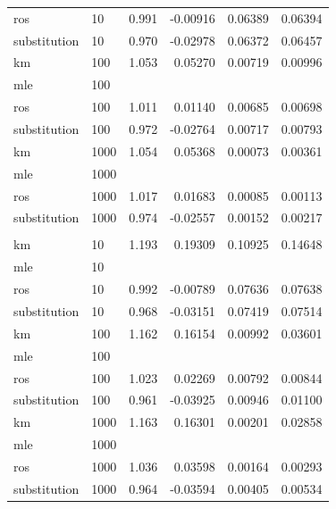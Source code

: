 \documentclass[12pt, twoside]{amherstthesis}
\begin{document}
\begin{table}
\begin{tabular}[t]{llrrrr}
\hspace{1em}ros & 10 & 0.991 & -0.00916 & 0.06389 & 0.06394\\
\hspace{1em}substitution & 10 & 0.970 & -0.02978 & 0.06372 & 0.06457\\
\hline
\hspace{1em}km & 100 & 1.053 & 0.05270 & 0.00719 & 0.00996\\
\hspace{1em}mle & 100 &  &  &  \vphantom{1} & \\
\hspace{1em}ros & 100 & 1.011 & 0.01140 & 0.00685 & 0.00698\\
\hspace{1em}substitution & 100 & 0.972 & -0.02764 & 0.00717 & 0.00793\\
\hline
\hspace{1em}km & 1000 & 1.054 & 0.05368 & 0.00073 & 0.00361\\
\hspace{1em}mle & 1000 &  &  &  \vphantom{1} & \\
\hspace{1em}ros & 1000 & 1.017 & 0.01683 & 0.00085 & 0.00113\\
\hspace{1em}substitution & 1000 & 0.974 & -0.02557 & 0.00152 & 0.00217\\
\hline
\addlinespace[1em]
\multicolumn{6}{l}{\textbf{Censoring Rate = 0.5}}\\
\hspace{1em}km & 10 & 1.193 & 0.19309 & 0.10925 & 0.14648\\
\hspace{1em}mle & 10 &  &  &  & \\
\hspace{1em}ros & 10 & 0.992 & -0.00789 & 0.07636 & 0.07638\\
\hspace{1em}substitution & 10 & 0.968 & -0.03151 & 0.07419 & 0.07514\\
\hline
\hspace{1em}km & 100 & 1.162 & 0.16154 & 0.00992 & 0.03601\\
\hspace{1em}mle & 100 &  &  &  & \\
\hspace{1em}ros & 100 & 1.023 & 0.02269 & 0.00792 & 0.00844\\
\hspace{1em}substitution & 100 & 0.961 & -0.03925 & 0.00946 & 0.01100\\
\hline
\hspace{1em}km & 1000 & 1.163 & 0.16301 & 0.00201 & 0.02858\\
\hspace{1em}mle & 1000 &  &  &  & \\
\hspace{1em}ros & 1000 & 1.036 & 0.03598 & 0.00164 & 0.00293\\
\hspace{1em}substitution & 1000 & 0.964 & -0.03594 & 0.00405 & 0.00534\\
\bottomrule
\end{tabular}
\end{table}
\end{document}
